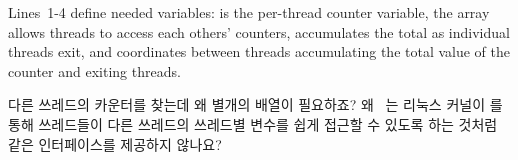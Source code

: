 Lines~1-4 define needed variables:  is the per-thread counter
variable, the  array allows threads to access each others'
counters,  accumulates the total as individual threads exit,
and  coordinates between threads accumulating the total
value of the counter and exiting threads.
\fi

\QuickQuiz{}
	다른 쓰레드의 카운터를 찾는데 왜 별개의 배열이 필요하죠?
	왜 \GCC\ 는 리눅스 커널이  를 통해 쓰레드들이 다른
	쓰레드의 쓰레드별 변수를 쉽게 접근할 수 있도록 하는 것처럼
	 같은 인터페이스를 제공하지 않나요?

